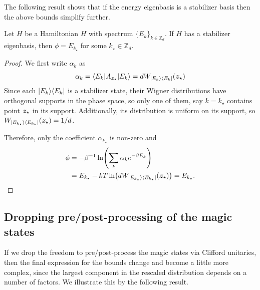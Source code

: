 \documentclass[pra,
aps,
twocolumn,
superscriptaddress,
groupedaddress,
nofootinbib,
reprint
]{revtex4-1}
\begin{document}
The following result shows that if the energy eigenbasis is a stabilizer basis then the above bounds simplify further.
\begin{proposition} \label{sharp-phi}
	Let $H$ be a Hamiltonian $H$ with spectrum $\{E_k\}_{k \in \mathbb{Z}_d}$.
	If $H$ has a stabilizer eigenbasis, then $\phi = E_{k_{\star}}$ for some $k_{\star} \in \mathbb{Z}_d$.
\end{proposition}
\begin{proof}
	We first write $\alpha_k$ as
\begin{equation}
	\alpha_k = \langle E_k | A_{\bm{z}_{\star}} |E_k\rangle = d W_{|E_k\rangle\langle E_k|}(\bm{z}_{\star})
\end{equation}
Since each $|E_k\rangle\langle E_k|$ is a stabilizer state, their Wigner distributions have orthogonal supports in the phase space, so only one of them, say $k = k_{\star}$ contains point $\bm{z}_{\star}$ in its support. 
Additionally, its distribution is uniform on its support, so $W_{|E_{k_\star}\rangle\langle E_{k_\star}|}(\bm{z}_{\star}) = 1/d$.

Therefore, only the coefficient $\alpha_{k_{\star}}$ is non-zero and
\begin{align}
\phi &= -\beta^{-1}\ln (\sum_k \alpha_k e^{-\beta E_k}) \nonumber \\
&=E_{k_{\star}} -kT \ln (d W_{|E_{k_\star}\rangle\langle E_{k_\star}|}(\bm{z}_{\star})) =E_{k_{\star}}.
\end{align}

\end{proof}

\subsection{Dropping pre/post-processing of the magic states}
\label{app:cliff_processing}

If we drop the freedom to pre/post-process the magic states via Clifford unitaries, then the final expression for the bounds change and become a little more complex, since the largest component in the rescaled distribution depends on a number of factors. We illustrate this by the following result.
\end{document}
